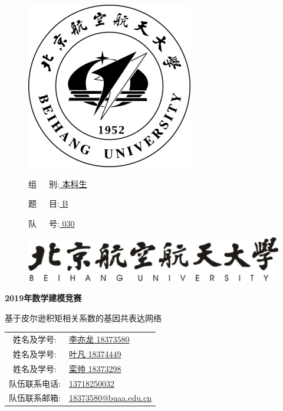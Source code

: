 \documentclass[zihao=-4]{ctexart}
\begin{document}
\lhead{}%
\rhead{}%
\begin{figure}
    \begin{minipage}{0.6\linewidth}
        \includegraphics{pic/xiaohui.png}
    \end{minipage}
    \hfill
    \begin{minipage}{0.3\linewidth}
        组\ \ \ 别:\underline{ 本科生 }
        
        题\ \ \ 目:\underline{ B }

        队\ \ \ 号:\underline{ 030 }
    \end{minipage}
\end{figure}
\vbox{}
\begin{figure}[H]
    \centering
    \includegraphics{pic/xiaoming.png}
\end{figure}
\vbox{}
\centerline{\textbf{\Huge{2019年数学建模竞赛}}}
\vbox{}
\begin{center}
    \LARGE 基于皮尔逊积矩相关系数的基因共表达网络
\end{center}
\vbox{}
\vbox{}
\begin{table}[b]
    \centering
    \begin{tabular}{cl}
        姓名及学号: & \underline{李亦龙 18373580}\\
        姓名及学号: & \underline{叶凡 18374449}\\
        姓名及学号: & \underline{栾帅 18373298}\\
        队伍联系电话:&\underline{13718250032}\\
        队伍联系邮箱:&\underline{18373580@buaa.edu.cn}
    \end{tabular}
\end{table}
\normalsize
\renewcommand{\headrulewidth}{0pt}%
\newpage
\end{document}
